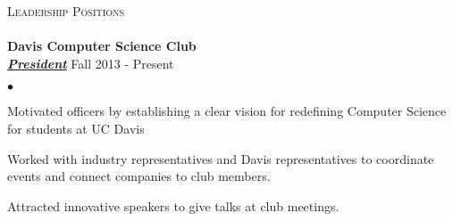 \documentclass{article}
\newcommand{\lineunder}{\vspace*{-8pt} \\ \hspace*{-18pt} \hrulefill \\}
\newcommand{\header}[1]{{\hspace*{-15pt}\vspace*{6pt} \textsc{#1}} \vspace*{-6pt} \lineunder}
\newcommand{\employer}[3]{{ \textbf{#1} \\ \underline{\textbf{\emph{#3}}} \hfill #2\\  }}
\newenvironment{achievements}{\begin{list}{$\bullet$}{\topsep 0pt \itemsep -2pt}}{\vspace*{4pt}\end{list}}
\begin{document}
\header{Leadership Positions}
\employer{Davis Computer Science Club}{Fall 2013 - Present}{President}
\begin{achievements}
\item Motivated officers by establishing a clear vision for redefining
  Computer Science for students at UC Davis
\item Worked with industry representatives and Davis representatives
  to coordinate events and connect companies to club members.
\item Attracted innovative speakers to give talks at club meetings.
\end{achievements}
\end{document}
